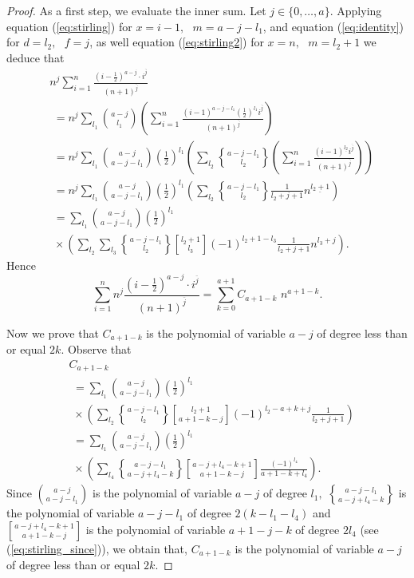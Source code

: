 \documentclass[final,5p,times,twocolumn]{elsarticle_mod}
\begin{document}
\begin{proof}
As a first step, we evaluate the inner sum.
Let $j\in\{0,\dots, a\}.$
Applying equation (\ref{eq:stirling}) for $x=i-1,\,\,$ $m=a-j-l_1$, 
and equation (\ref{eq:identity}) for $d=l_2,\,\,$ $f=j$,
as well equation (\ref{eq:stirling2}) for $x=n,\,\,$ $m=l_2+1$  we deduce that
\begin{align*}
&n^j\sum_{i=1}^{n}   \frac{ \left(i-\frac{1}{2}\right)^{a-j}\cdot i^{\overline{j}}}{(n+1)^{\overline{j}}}\\
&\,\,=n^j\sum_{l_1}\binom{a-j}{l_1}\left(\sum_{i=1}^{n}\frac{(i-1)^{a-j-l_1}\left(\frac{1}{2}\right)^{l_1}i^{\overline{j}}}{(n+1)^{\overline{j}}}\right)\\
&\,\,=n^j\sum_{l_1}\binom{a-j}{a-j-l_1}\left(\frac{1}{2}\right)^{l_1}\left(\sum_{l_2}{a-j-l_1\brace l_2}  \left(\sum_{i=1}^{n}\frac{(i-1)^{\underline{l_2}}i^{\overline{j}}}{(n+1)^{\overline{j}}}\right)\right)\\
&\,\,=n^j\sum_{l_1}\binom{a-j}{a-j-l_1}\left(\frac{1}{2}\right)^{l_1}\left(\sum_{l_2}{a-j-l_1\brace l_2} \frac{1}{l_2+j+1}n^{\underline{l_2+1}}\right)\\
&\,\,=\sum_{l_1}\binom{a-j}{a-j-l_1}\left(\frac{1}{2}\right)^{l_1}\\
&\,\,\times\left(\sum_{l_2}\sum_{l_3}{a-j-l_1\brace l_2}{l_2+1\brack l_3}(-1)^{l_2+1-l_3} \frac{1}{l_2+j+1}n^{l_3+j}\right).
\end{align*}
Hence $$\sum_{i=1}^{n} n^j  \frac{ \left(i-\frac{1}{2}\right)^{a-j}\cdot i^{\overline{j}}}{(n+1)^{\overline{j}}}=\sum_{k=0}^{a+1}C_{a+1-k}\,\, n^{a+1-k}.$$

Now we prove that $C_{a+1-k}$ is the polynomial of variable $a-j$ of degree less than or equal $2k.$
Observe that
\begin{align*}
&C_{a+1-k}\\
&\,\,=\sum_{l_1}\binom{a-j}{a-j-l_1}\left(\frac{1}{2}\right)^{l_1}\\
&\,\,\times\left(\sum_{l_2}{a-j-l_1\brace l_2}{l_2+1\brack a+1-k-j}(-1)^{l_2-a+k+j} \frac{1}{l_2+j+1}\right)\\
&\,\,=\sum_{l_1}\binom{a-j}{a-j-l_1}\left(\frac{1}{2}\right)^{l_1}\\
&\,\,\times\left(\sum_{l_4}{a-j-l_1\brace a-j+l_4-k}{a-j+l_4-k+1\brack a+1-k-j}\frac{(-1)^{l_4}}{a+1-k+l_4}\right).
\end{align*}
Since $\binom{a-j}{a-j-l_1}$ is the polynomial of variable $a-j$ of degree $l_1,$
${a-j-l_1\brace a-j+l_4-k}$ is the polynomial of variable $a-j-l_1$ of degree $2(k-l_1-l_4)$
and ${a-j+l_4-k+1\brack a+1-k-j}$ is the polynomial of variable $a+1-j-k$ of degree $2l_4$ (see (\ref{eq:stirling_since})),
we obtain that, $C_{a+1-k}$ is the polynomial of variable $a-j$ of degree less than or equal $2k.$ 


\end{proof}
\end{document}
